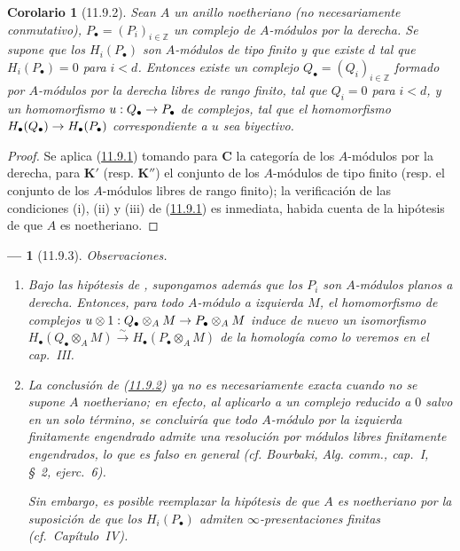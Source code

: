 \documentclass[10pt,oneside,openany]{book}
\theoremstyle{egaenv}\newtheorem*{env}{---}
\theoremstyle{egastatement}
\newtheorem*{corollary}{Corolario}
\theoremstyle{egadescription}
\renewcommand{\to}{\mathchoice{\longrightarrow}{\rightarrow}{\rightarrow}{\rightarrow}}
\begin{document}
\begin{corollary}[11.9.2]
\label{0.11.9.2-fr}
Sean $A$ un anillo noetheriano (no necesariamente conmutativo), $P_\bullet=(P_i)_{i\in\mathbb Z}$ un complejo de $A$-módulos por la derecha. Se supone que los $H_i(P_\bullet)$ son $A$-módulos de tipo finito y que existe $d$ tal que $H_i(P_\bullet)=0$ para $i<d$. Entonces existe un complejo $Q_\bullet=(Q_i)_{i\in\mathbb Z}$ formado por $A$-módulos por la derecha libres de rango finito, tal que $Q_i=0$ para $i<d$, y un homomorfismo $u:Q_\bullet\to P_\bullet$ de complejos, tal que el homomorfismo $H_\bullet(Q_\bullet)\to H_\bullet(P_\bullet)$ correspondiente a $u$ sea biyectivo.
\end{corollary}

\begin{proof}
Se aplica (\hyperref[0.11.9.1-fr]{11.9.1}) tomando para $\boldsymbol{C}$ la categoría de los $A$-módulos por la derecha, para $\boldsymbol{K}'$ (resp. $\boldsymbol{K}''$) el conjunto de los $A$-módulos de tipo finito (resp. el conjunto de los $A$-módulos libres de rango finito); la verificación de las condiciones (i), (ii) y (iii) de (\hyperref[0.11.9.1-fr]{11.9.1}) es inmediata, habida cuenta de la hipótesis de que $A$ es noetheriano.
\end{proof}

\begin{env}[11.9.3]
\label{0.11.9.3}
\label{0.11.9.3-fr}
\emph{Observaciones}.
\begin{enumerate}
  \item[{\rm(i)}]
  Bajo las hipótesis de , supongamos además que los
  $P_i$ son $A$-módulos \emph{planos} a derecha.
  Entonces, para todo $A$-módulo a izquierda $M$, el homomorfismo de complejos
  $u\otimes 1:Q_\bullet\otimes_A M\to P_\bullet\otimes_A M$
  induce de nuevo un \emph{isomorfismo}
  $H_\bullet(Q_\bullet\otimes_A M)\xrightarrow{\sim}
H_\bullet(P_\bullet\otimes_A M)$ de la homología como lo veremos en el cap.~III.
\item[{\rm(ii)}] La conclusión de (\hyperref[0.11.9.2-fr]{11.9.2}) ya no es necesariamente exacta cuando no se supone $A$ \emph{noetheriano}; en efecto, al aplicarlo a un complejo reducido a $0$ salvo en un solo término, se concluiría que todo $A$-módulo por la izquierda finitamente engendrado admite una \emph{resolución} por
  módulos libres finitamente engendrados, lo que es falso en general
(cf. Bourbaki, \emph{Alg. comm.}, cap.~I, \S~2, ejerc.~6).

  Sin embargo, es posible reemplazar la hipótesis de que $A$ es
  noetheriano por la suposición de que los $H_i(P_\bullet)$ admiten
  $\infty$-presentaciones finitas (cf.\ Capítulo~IV).
\end{enumerate}
\end{env}
\end{document}
